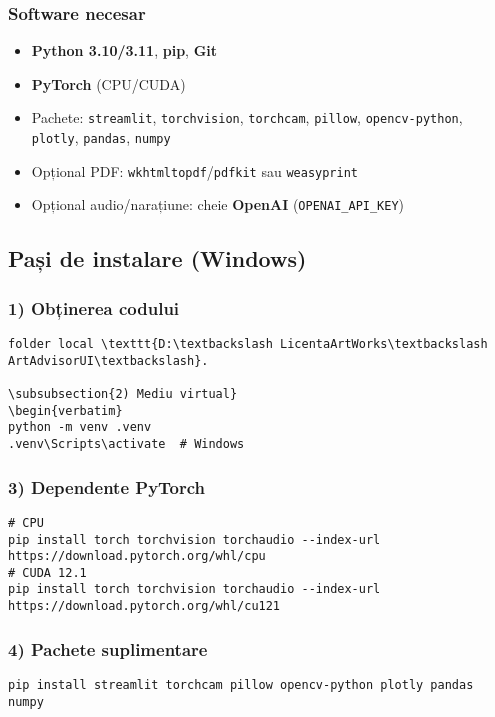 \subsubsection{Software necesar}
\begin{itemize}[noitemsep,topsep=2pt]
  \item \textbf{Python 3.10/3.11}, \textbf{pip}, \textbf{Git}
  \item \textbf{PyTorch} (CPU/CUDA)
  \item Pachete: \texttt{streamlit}, \texttt{torchvision}, \texttt{torchcam}, \texttt{pillow}, \texttt{opencv-python}, \texttt{plotly}, \texttt{pandas}, \texttt{numpy}
  \item Opțional PDF: \texttt{wkhtmltopdf}/\texttt{pdfkit} sau \texttt{weasyprint}
  \item Opțional audio/narațiune: cheie \textbf{OpenAI} (\texttt{OPENAI\_API\_KEY})
\end{itemize}

\subsection{Pași de instalare (Windows)}
\subsubsection{1) Obținerea codului}
\begin{verbatim}
folder local \texttt{D:\textbackslash LicentaArtWorks\textbackslash ArtAdvisorUI\textbackslash}.

\subsubsection{2) Mediu virtual}
\begin{verbatim}
python -m venv .venv
.venv\Scripts\activate  # Windows
\end{verbatim}

\subsubsection{3) Dependente PyTorch}
\begin{verbatim}
# CPU
pip install torch torchvision torchaudio --index-url https://download.pytorch.org/whl/cpu
# CUDA 12.1
pip install torch torchvision torchaudio --index-url https://download.pytorch.org/whl/cu121
\end{verbatim}

\subsubsection{4) Pachete suplimentare}
\begin{verbatim}
pip install streamlit torchcam pillow opencv-python plotly pandas numpy
\end{verbatim}

